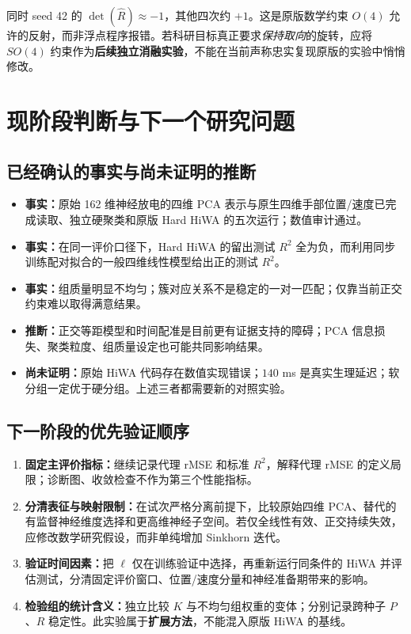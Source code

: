 \documentclass[UTF8,zihao=-4,a4paper]{ctexart}
\begin{document}
同时 seed 42 的 $\det(\widehat R)\approx-1$，其他四次约 $+1$。这是原版数学约束 $O(4)$ 允许的反射，而非浮点程序报错。若科研目标真正要求\emph{保持取向}的旋转，应将 $SO(4)$ 约束作为\textbf{后续独立消融实验}，不能在当前声称忠实复现原版的实验中悄悄修改。

\section{现阶段判断与下一个研究问题}
\subsection{已经确认的事实与尚未证明的推断}
\begin{itemize}
\item \textbf{事实：}原始 162 维神经放电的四维 PCA 表示与原生四维手部位置/速度已完成读取、独立硬聚类和原版 Hard HiWA 的五次运行；数值审计通过。
\item \textbf{事实：}在同一评价口径下，Hard HiWA 的留出测试 $R^2$ 全为负，而利用同步训练配对拟合的一般四维线性模型给出正的测试 $R^2$。
\item \textbf{事实：}组质量明显不均匀；簇对应关系不是稳定的一对一匹配；仅靠当前正交约束难以取得满意结果。
\item \textbf{推断：}正交等距模型和时间配准是目前更有证据支持的障碍；PCA 信息损失、聚类粒度、组质量设定也可能共同影响结果。
\item \textbf{尚未证明：}原始 HiWA 代码存在数值实现错误；$140$ ms 是真实生理延迟；软分组一定优于硬分组。上述三者都需要新的对照实验。
\end{itemize}

\subsection{下一阶段的优先验证顺序}
\begin{enumerate}[leftmargin=2.5em,itemsep=4pt]
\item \textbf{固定主评价指标：}继续记录代理 rMSE 和标准 $R^2$，解释代理 rMSE 的定义局限；诊断图、收敛检查不作为第三个性能指标。
\item \textbf{分清表征与映射限制：}在试次严格分离前提下，比较原始四维 PCA、替代的有监督神经维度选择和更高维神经子空间。若仅全线性有效、正交持续失效，应修改数学研究假设，而非单纯增加 Sinkhorn 迭代。
\item \textbf{验证时间因素：}把 $\ell$ 仅在训练验证中选择，再重新运行同条件的 HiWA 并评估测试，分清固定评价窗口、位置/速度分量和神经准备期带来的影响。
\item \textbf{检验组的统计含义：}独立比较 $K$ 与不均匀组权重的变体；分别记录跨种子 $P$、$R$ 稳定性。此实验属于\textbf{扩展方法}，不能混入原版 HiWA 的基线。
\end{enumerate}
\end{document}
